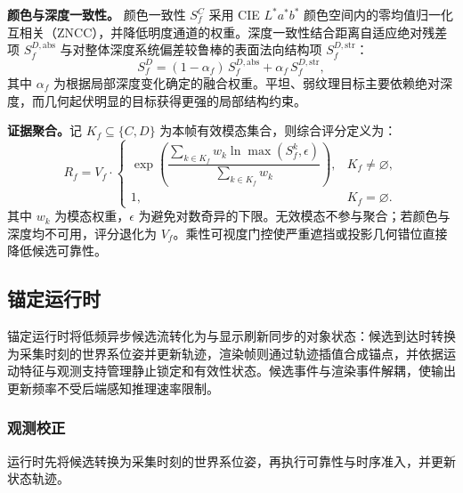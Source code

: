 \documentclass[review]{vgtc}
\begin{document}
\textbf{颜色与深度一致性。}
颜色一致性 $S_f^C$ 采用 CIE $L^*a^*b^*$ 颜色空间内的零均值归一化互相关（ZNCC），并降低明度通道的权重。深度一致性结合距离自适应绝对残差项 $S_f^{D,\mathrm{abs}}$ 与对整体深度系统偏差较鲁棒的表面法向结构项 $S_f^{D,\mathrm{str}}$：
\begin{equation}
S_f^D = (1-\alpha_f)\,S_f^{D,\mathrm{abs}} + \alpha_f\,S_f^{D,\mathrm{str}},
\label{eq:depth-score}
\end{equation}
其中 $\alpha_f$ 为根据局部深度变化确定的融合权重。平坦、弱纹理目标主要依赖绝对深度，而几何起伏明显的目标获得更强的局部结构约束。

\textbf{证据聚合。}记 $K_f\subseteq\{C,D\}$ 为本帧有效模态集合，则综合评分定义为：
\begin{equation}
R_f = V_f \cdot
\begin{cases}
\exp\!\left(\dfrac{\sum_{k \in K_f} w_k \ln \max(S_f^{k}, \epsilon)}{\sum_{k \in K_f} w_k}\right), & K_f \neq \varnothing, \\[6pt]
1, & K_f = \varnothing.
\end{cases}
\label{eq:vcd}
\end{equation}
其中 $w_k$ 为模态权重，$\epsilon$ 为避免对数奇异的下限。无效模态不参与聚合；若颜色与深度均不可用，评分退化为 $V_f$。乘性可视度门控使严重遮挡或投影几何错位直接降低候选可靠性。

\subsection{锚定运行时}\label{sec:anchoring}

锚定运行时将低频异步候选流转化为与显示刷新同步的对象状态：候选到达时转换为采集时刻的世界系位姿并更新轨迹，渲染帧则通过轨迹插值合成锚点，并依据运动特征与观测支持管理静止锁定和有效性状态。候选事件与渲染事件解耦，使输出更新频率不受后端感知推理速率限制。

\subsubsection{观测校正}\label{sec:obs-update}

运行时先将候选转换为采集时刻的世界系位姿，再执行可靠性与时序准入，并更新状态轨迹。
\end{document}
